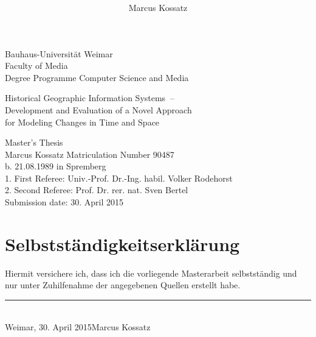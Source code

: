 \documentclass[11pt, a4paper]{report}
\title{\titleFirst $~$ \\ \titleSecond}
\author{Marcus Kossatz}
\date{\submissionDate}
\newcommand{\submissionDate}{30. April 2015}
\newcommand{\titleFirst}{Historical Geographic Information Systems}
\newcommand{\titleSecond}{Development and Evaluation of a Novel Approach}
\newcommand{\titleThird}{for Modeling Changes in Time and Space}
\begin{document}

\begin{titlepage}

Bauhaus-Universität Weimar \\
Faculty of Media \\
Degree Programme Computer Science and Media \\ [2.0cm]

\begin{center}

{\huge \titleFirst $~$ --} \\[0.5cm]
{\huge \titleSecond} \\[0.3cm]
{\huge \titleThird} \\[2.5cm]
\end{center}

{\LARGE Master's Thesis} \\[1.0cm]

Marcus Kossatz \hfill Matriculation Number 90487 \\
b. 21.08.1989 in Spremberg \\

1. First Referee: Univ.-Prof. Dr.-Ing. habil. Volker Rodehorst \\
2. Second Referee: Prof. Dr. rer. nat. Sven Bertel \\

\vfill
Submission date: \submissionDate

\end{titlepage}



\tableofcontents

\listoffigures
\listoftables



\newpage

\section*{Selbstständigkeitserklärung}

\vspace{10px}

Hiermit versichere ich, dass ich die vorliegende Masterarbeit selbstständig und nur unter Zuhilfenahme der angegebenen Quellen erstellt habe.

\vspace{20px}

\hfill \rule{120px}{0.5px} \\
Weimar, \submissionDate \hfill Marcus Kossatz

\newpage












{}




\end{document}
